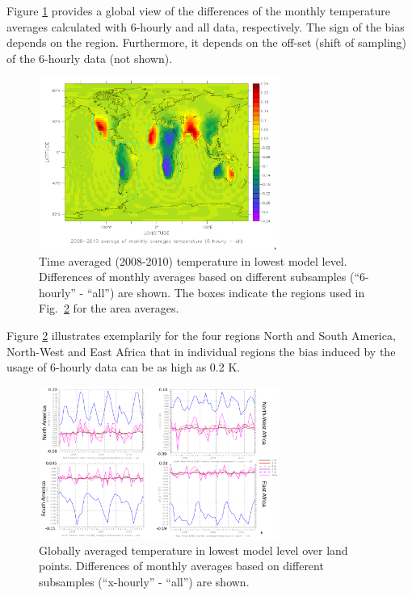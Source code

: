 \documentclass[twoside]{article}
\begin{document}
Figure \ref{fig:EMAC-timeave} provides a global view of the differences of the
monthly temperature averages calculated with 6-hourly and all data,
respectively.  The sign of the bias depends on the
region. Furthermore, it depends on the off-set (shift of sampling)
of the 6-hourly data (not shown).
\begin{figure}
  \begin{center}
  \includegraphics[width=0.7\textwidth]{EMAC_08-10ave_ll_temp_6hrly}
  \caption{\label{fig:EMAC-timeave} Time averaged (2008-2010) temperature in lowest
    model level. Differences of monthly averages based on different subsamples
    (``6-hourly'' - ``all'')
    are shown. The boxes indicate the regions used in
    Fig.\ \ref{fig:EMAC-4regions} for the area averages.}
  \end{center}
\end{figure}

Figure \ref{fig:EMAC-4regions} illustrates exemplarily for the four regions
North and South America, North-West and East Africa that in individual
regions the bias induced by the usage of 6-hourly data can be as high as 0.2 K.

\begin{figure}
  \begin{center}
  \includegraphics[width=0.7\textwidth]{EMAC-4regions}
  \caption{\label{fig:EMAC-4regions} Globally averaged temperature in lowest
    model level over land points. Differences of monthly averages
    based on different subsamples (``x-hourly'' - ``all'') are shown.}
  \end{center}
\end{figure}
\end{document}
